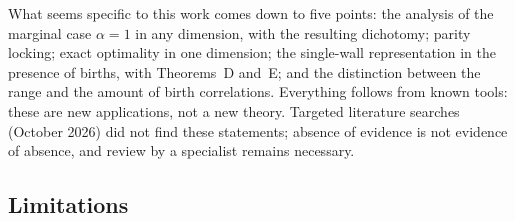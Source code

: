 What seems specific to this work comes down to five points: the analysis of the marginal case $\alpha=1$ in any dimension, with the resulting dichotomy; parity locking; exact optimality in one dimension; the single-wall representation in the presence of births, with Theorems~D and~E; and the distinction between the range and the amount of birth correlations. Everything follows from known tools: these are new applications, not a new theory. Targeted literature searches (October 2026) did not find these statements; absence of evidence is not evidence of absence, and review by a specialist remains necessary.

\subsection{Limitations}


